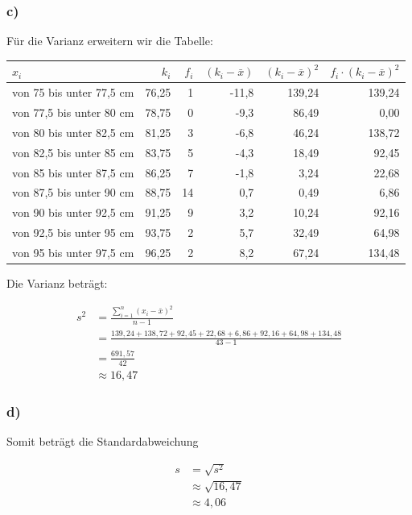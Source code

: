 \documentclass[
  11pt,
  ngerman,
  a4paper,
]{report}
\begin{document}
\hypertarget{c-5}{%
\subsubsection{c)}\label{c-5}}

Für die Varianz erweitern wir die Tabelle:

\begin{table}[H]
\centering
\begin{tabular}{lrrrrr}
\toprule
$x_i$ & $k_i$ & $f_i$ & $(k_i - \bar{x})$ & $(k_i - \bar{x})^2$ & $f_i \cdot (k_i - \bar{x})^2$\\
\midrule
von 75 bis unter 77,5 cm & 76,25 & 1 & -11,8 & 139,24 & 139,24\\
von 77,5 bis unter 80 cm & 78,75 & 0 & -9,3 & 86,49 & 0,00\\
von 80 bis unter 82,5 cm & 81,25 & 3 & -6,8 & 46,24 & 138,72\\
von 82,5 bis unter 85 cm & 83,75 & 5 & -4,3 & 18,49 & 92,45\\
von 85 bis unter 87,5 cm & 86,25 & 7 & -1,8 & 3,24 & 22,68\\
von 87,5 bis unter 90 cm & 88,75 & 14 & 0,7 & 0,49 & 6,86\\
von 90 bis unter 92,5 cm & 91,25 & 9 & 3,2 & 10,24 & 92,16\\
von 92,5 bis unter 95 cm & 93,75 & 2 & 5,7 & 32,49 & 64,98\\
von 95 bis unter 97,5 cm & 96,25 & 2 & 8,2 & 67,24 & 134,48\\
\bottomrule
\end{tabular}
\end{table}

Die Varianz beträgt:

\[\begin{aligned}
  s^2&=\frac{\sum\limits_{i=1}^{n}(x_{i}-\bar{x})^2}{n-1} \\
     &=\frac{139{,}24+138{,}72+ 92{,}45+ 22{,}68+  6{,}86+ 92{,}16+ 64{,}98+134{,}48}{43-1}\\
     &=\frac{691{,}57}{42}\\
     &\approx{16{,}47}
\end{aligned}\]

\hypertarget{d}{%
\subsubsection{d)}\label{d}}

Somit beträgt die Standardabweichung

\[\begin{aligned}
  s&=\sqrt{s^2}\\
   &\approx\sqrt{16{,}47}\\
   &\approx4{,}06
\end{aligned}\]
\end{document}
